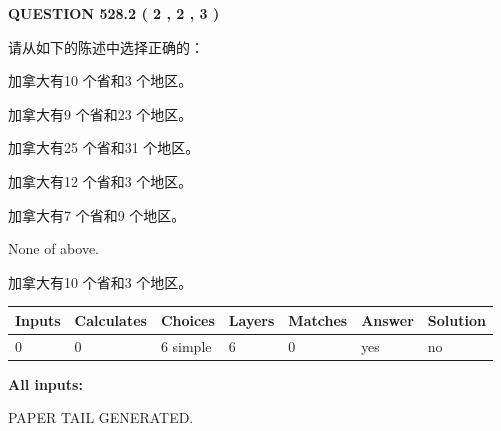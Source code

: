 \documentclass{ctexart}
\begin{document}
   
  
\vspace{0.2in}
  
{\textbf{\Large{QUESTION
528.2 
 ( 2 , 2 , 3 )
}}}
  
  
请从如下的陈述中选择正确的：
 
 
加拿大有10 个省和3 个地区。
 
 
加拿大有9 个省和23 个地区。
 
 
加拿大有25 个省和31 个地区。
 
 
加拿大有12 个省和3 个地区。
 
 
加拿大有7 个省和9 个地区。
 
 
 None of above.
 
 
\noindent{}
 
 
加拿大有10 个省和3 个地区。
 
 
\noindent{}
 
 
   
   
   
   
\noindent\begin{tabular}{|l|l|l|l|l|l|l|}
 \hline
Inputs & Calculates & Choices & Layers & Matches & Answer & Solution \\ \hline
 0  & 
 0  & 
 6
  simple  
  & 
 6  & 
 0  & 
  yes & 
  no 
  \\ \hline
 \end{tabular}
   
   
   
   
\noindent{}
   
   
   
   
\noindent\vspace{0.1in}\hspace{-0.08in} {\textbf{\Large{All inputs: }}}
   
   
   
   
   
   
 \vspace{0.2in}
 
   
   
\vspace{2.0in} PAPER TAIL GENERATED.
   
\end{document}
